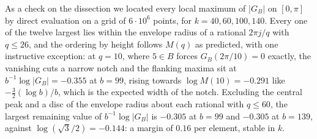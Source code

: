 \begin{remark}\label{rem:peakscan}
As a check on the dissection we located every local maximum of $|G_B|$ on
$[0,\pi]$ by direct evaluation on a grid of $6\cdot10^{6}$ points, for
$k=40,60,100,140$. Every one of the twelve largest lies within the envelope
radius of a rational $2\pi j/q$ with $q\le26$, and the ordering by height
follows $M(q)$ as predicted, with one instructive exception: at $q=10$, where
$5\in B$ forces $G_B(2\pi/10)=0$ exactly, the vanishing cuts a narrow notch and
the flanking maxima sit at $b^{-1}\log|G_B|=-0.355$ at $b=99$, rising towards
$\log M(10)=-0.291$ like $-\tfrac32(\log b)/b$, which is the expected width of
the notch. Excluding the central peak and a disc of the envelope radius about
each rational with $q\le60$, the largest remaining value of
$b^{-1}\log|G_B|$ is $-0.305$ at $b=99$ and $-0.305$ at $b=139$, against
$\log(\sqrt3/2)=-0.144$: a margin of $0.16$ per element, stable in $k$.
\end{remark}
